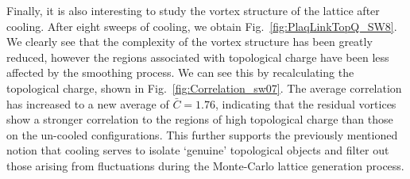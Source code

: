 Finally, it is also interesting to study the vortex structure of the lattice after cooling. After eight sweeps of cooling, we obtain Fig.~\ref{fig:PlaqLinkTopQ_SW8}. We clearly see that the complexity of the vortex structure has been greatly reduced, however the regions associated with topological charge have been less affected by the smoothing process. We can see this by recalculating the topological charge, shown in Fig.~\ref{fig:Correlation_sw07}. The average correlation has increased to a new average of $\bar{C}=1.76$, indicating that the residual vortices show a stronger correlation to the regions of high topological charge than those on the un-cooled configurations. This further supports the previously mentioned notion that cooling serves to isolate `genuine' topological objects and filter out those arising from fluctuations during the Monte-Carlo lattice generation process.

